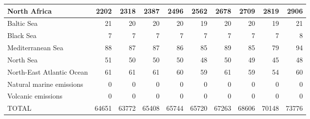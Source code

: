 \begin{table}
\begin{tabular}{|l|r|r|r|r|r|r|r|r|r|}
                  North Africa&   2202&   2318&   2387&   2496&   2562&   2678&   2709&   2819&   2906\\\hline
                    Baltic Sea&     21&     20&     20&     20&     19&     20&     20&     19&     21\\\hline
                     Black Sea&      7&      7&      7&      7&      7&      7&      7&      7&      8\\\hline
             Mediterranean Sea&     88&     87&     87&     86&     85&     89&     85&     79&     94\\\hline
                     North Sea&     51&     50&     50&     50&     48&     50&     49&     45&     48\\\hline
     North-East Atlantic Ocean&     61&     61&     61&     60&     59&     61&     59&     54&     60\\\hline
      Natural marine emissions&      0&      0&      0&      0&      0&      0&      0&      0&      0\\\hline
            Volcanic emissions&      0&      0&      0&      0&      0&      0&      0&      0&      0\\\hline\hline
                         TOTAL&  64651&  63772&  65408&  65744&  65720&  67263&  68606&  70148&  73776\\\hline
 \end{tabular}
 \end{table}
 

